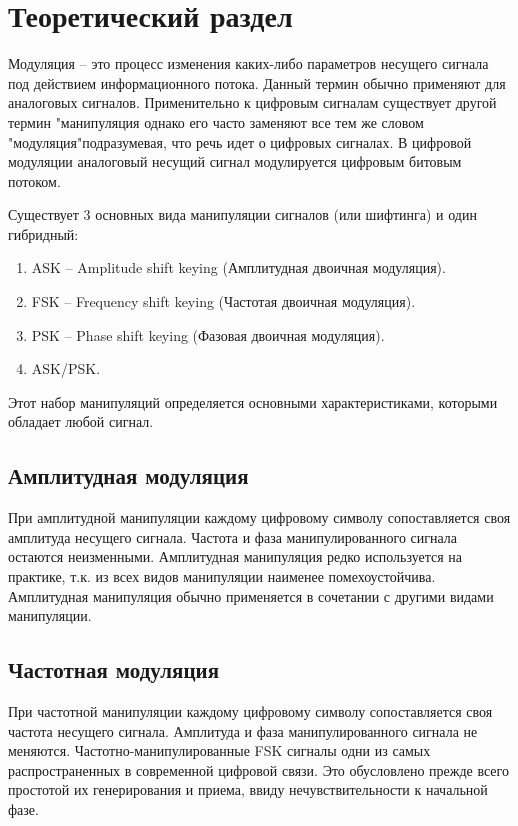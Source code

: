 \documentclass[a4paper,14pt]{extarticle}
\begin{document}
\section{Теоретический раздел}

Модуляция – это процесс изменения каких-либо параметров несущего сигнала под действием информационного потока. Данный термин обычно применяют для аналоговых сигналов. Применительно к цифровым сигналам существует другой термин "манипуляция однако его часто заменяют все тем же словом "модуляция"подразумевая, что речь идет о цифровых сигналах. В цифровой модуляции аналоговый несущий сигнал модулируется цифровым битовым потоком.

Существует 3 основных вида манипуляции сигналов (или шифтинга) и один гибридный:
\begin{enumerate}
\item ASK – Amplitude shift keying (Амплитудная двоичная модуляция).
\item FSK – Frequency shift keying (Частотая двоичная модуляция).
\item PSK – Phase shift keying (Фазовая двоичная модуляция).
\item ASK/PSK.
\end{enumerate}
Этот набор манипуляций определяется основными характеристиками, которыми обладает любой сигнал.

\subsection{Амплитудная модуляция}
При амплитудной манипуляции каждому цифровому символу сопоставляется своя амплитуда несущего
сигнала. Частота и фаза манипулированного сигнала остаются неизменными. Амплитудная манипуляция
редко используется на практике, т.к. из всех видов манипуляции наименее помехоустойчива. Амплитудная
манипуляция обычно применяется в сочетании с другими видами манипуляции.

\subsection{Частотная модуляция}

При частотной манипуляции каждому цифровому символу сопоставляется своя частота несущего сигнала.
Амплитуда и фаза манипулированного сигнала не меняются. Частотно-манипулированные FSK сигналы
одни из самых распространенных в современной цифровой связи. Это обусловлено прежде всего простотой их генерирования и приема, ввиду нечувствительности к начальной фазе.
\end{document}
